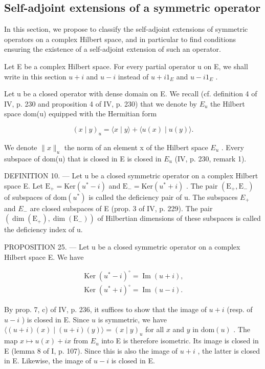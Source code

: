 \subsection{Self-adjoint extensions of a symmetric operator}

In this section, we propose to classify the self-adjoint extensions of symmetric operators on a complex Hilbert space, and in particular to find conditions ensuring the existence of a self-adjoint extension of such an operator.

Let E be a complex Hilbert space. For every partial operator u on E, we shall write in this section \(u + i\) and \(u - i\) instead of \(u + i1_{E}\) and \(u - i1_{E}\) .

Let u be a closed operator with dense domain on E. We recall (cf. definition 4 of IV, p. 230 and proposition 4 of IV, p. 230) that we denote by \(E_{u}\) the Hilbert space dom(u) equipped with the Hermitian form

\[
(x \mid y) _ {u} = \langle x \mid y \rangle + \langle u (x) \mid u (y) \rangle .
\]

We denote \(\|x\|_{u}\) the norm of an element x of the Hilbert space \(E_{u}\) . Every subspace of dom(u) that is closed in E is closed in \(E_{u}\) (IV, p. 230, remark 1).

DEFINITION 10. --- Let u be a closed symmetric operator on a complex Hilbert space E. Let \(\mathrm{E}_{+} = \mathrm{Ker}(u^{*} - i)\) and \(\mathrm{E}_{-} = \mathrm{Ker}(u^{*} + i)\) . The pair \((\mathrm{E}_{+}, \mathrm{E}_{-})\) of subspaces of \(\mathrm{dom}(u^{*})\) is called the deficiency pair of u. The subspaces \(E_{+}\) and \(E_{-}\) are closed subspaces of E (prop. 3 of IV, p. 229). The pair \((\dim(\mathrm{E}_{+}), \dim(\mathrm{E}_{-}))\) of Hilbertian dimensions of these subspaces is called the deficiency index of u.

PROPOSITION 25. --- Let u be a closed symmetric operator on a complex Hilbert space E. We have

\[
\begin{array}{l} \operatorname{Ker} (u ^ {*} - i) ^ {\circ} = \operatorname{Im} (u + i), \\ \operatorname{Ker} (u ^ {*} + i) ^ {\circ} = \operatorname{Im} (u - i). \end{array}
\]

By prop. 7, c) of IV, p. 236, it suffices to show that the image of \(u + i\) (resp. of \(u - i\) ) is closed in E. Since \(u\) is symmetric, we have \(\langle (u + i)(x) \mid (u + i)(y) \rangle = (x \mid y)_u\) for all \(x\) and \(y\) in \(\text{dom}(u)\) . The map \(x \mapsto u(x) + ix\) from \(E_u\) into E is therefore isometric. Its image is closed in E (lemma 8 of I, p. 107). Since this is also the image of \(u + i\) , the latter is closed in E. Likewise, the image of \(u - i\) is closed in E.

